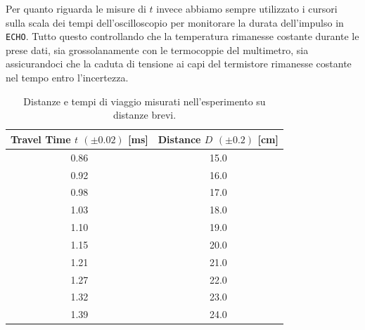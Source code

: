 \documentclass[10pt, a4paper, italian]{article}
\begin{document}
Per quanto riguarda le misure di $t$ invece abbiamo sempre utilizzato i
cursori sulla scala dei tempi dell'oscilloscopio per monitorare la durata
dell'impulso in \verb+ECHO+. Tutto questo controllando che la temperatura
rimanesse costante durante le prese dati, sia grossolanamente con le
termocoppie del multimetro, sia assicurandoci che la caduta di
tensione ai capi del termistore rimanesse costante nel tempo entro
l'incertezza.
\begin{table}[htbp]
\centering
\begin{tabular}{cc}
\toprule
Travel Time $t$ $(\pm 0.02)$ [ms] & Distance $D$ $(\pm 0.2)$ [cm] \\
\midrule
\midrule
0.86 & 15.0 \\
0.92 & 16.0 \\
0.98 & 17.0 \\
1.03 & 18.0	\\
1.10 & 19.0 \\
1.15 & 20.0 \\
1.21 & 21.0 \\
1.27 & 22.0 \\
1.32 & 23.0 \\
1.39 & 24.0 \\
\bottomrule
\end{tabular}
\caption{Distanze e tempi di viaggio misurati nell'esperimento su distanze
brevi.}
\end{table}
\end{document}
